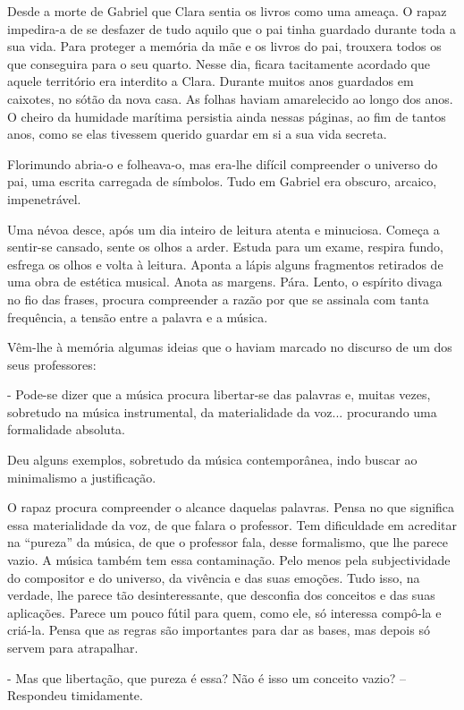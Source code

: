 Desde a morte de Gabriel que Clara sentia os livros como uma ameaça. O
rapaz impedira-a de se desfazer de tudo aquilo que o pai tinha guardado
durante toda a sua vida. Para proteger a memória da mãe e os livros do
pai, trouxera todos os que conseguira para o seu quarto. Nesse dia,
ficara tacitamente acordado que aquele território era interdito a Clara.
Durante muitos anos guardados em caixotes, no sótão da nova casa. As
folhas haviam amarelecido ao longo dos anos. O cheiro da humidade
marítima persistia ainda nessas páginas, ao fim de tantos anos, como se
elas tivessem querido guardar em si a sua vida secreta.

Florimundo abria-o e folheava-o, mas era-lhe difícil compreender o
universo do pai, uma escrita carregada de símbolos. Tudo em Gabriel era
obscuro, arcaico, impenetrável.

Uma névoa desce, após um dia inteiro de leitura atenta e minuciosa.
Começa a sentir-se cansado, sente os olhos a arder. Estuda para um
exame, respira fundo, esfrega os olhos e volta à leitura. Aponta a lápis
alguns fragmentos retirados de uma obra de estética musical. Anota as
margens. Pára. Lento, o espírito divaga no fio das frases, procura
compreender a razão por que se assinala com tanta frequência, a tensão
entre a palavra e a música.

Vêm-lhe à memória algumas ideias que o haviam marcado no discurso de um
dos seus professores:

- Pode-se dizer que a música procura libertar-se das palavras e, muitas
vezes, sobretudo na música instrumental, da materialidade da voz...
procurando uma formalidade absoluta.

Deu alguns exemplos, sobretudo da música contemporânea, indo buscar ao
minimalismo a justificação.

O rapaz procura compreender o alcance daquelas palavras. Pensa no que
significa essa materialidade da voz, de que falara o professor. Tem
dificuldade em acreditar na ``pureza'' da música, de que o professor
fala, desse formalismo, que lhe parece vazio. A música também tem essa
contaminação. Pelo menos pela subjectividade do compositor e do
universo, da vivência e das suas emoções. Tudo isso, na verdade, lhe
parece tão desinteressante, que desconfia dos conceitos e das suas
aplicações. Parece um pouco fútil para quem, como ele, só interessa
compô-la e criá-la. Pensa que as regras são importantes para dar as
bases, mas depois só servem para atrapalhar.

- Mas que libertação, que pureza é essa? Não é isso um conceito vazio?
-- Respondeu timidamente.

